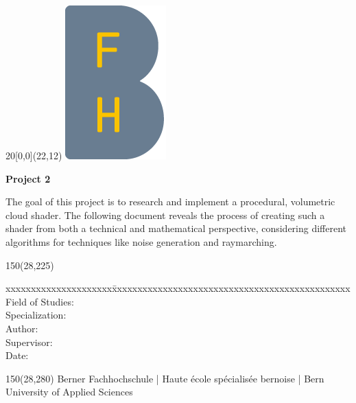 
\begin{titlepage}

\setlength{\unitlength}{1mm}

\begin{textblock}{20}[0,0](22,12)
    \includegraphics{../img/BFH_Logo_B.png}
\end{textblock}

\begin{flushleft}

\vspace*{21mm}

\fontsize{24.88pt}{40pt}\selectfont
\textbf{\doctitle}
\vspace{2mm}

\fontsize{17.28pt}{24pt}\selectfont\vspace{0.3em}
\docsubtitle
\vspace{5mm}

\fontsize{10pt}{12pt}\selectfont
\textbf{Project 2}

\fontsize{10pt}{12pt}\selectfont
The goal of this project is to research and implement a procedural, volumetric cloud shader. The following document reveals the process of creating such a shader from both a technical and mathematical perspective, considering different algorithms for techniques like noise generation and raymarching.
\begin{textblock}{150}(28,225)
\fontsize{10pt}{17pt}
\begin{tabbing}
xxxxxxxxxxxxxxxxxxxxx\=xxxxxxxxxxxxxxxxxxxxxxxxxxxxxxxxxxxxxxxxxxxxxxx \kill
Field of Studies:	\> \fieldofstudies	\\
Specialization:	    \> \specialisation	\\
Author:		        \> \docauthor \\
Supervisor:         \> \prof \\
Date:			    \> \versiondate
\end{tabbing}

\end{textblock}

\begin{textblock}{150}(28,280)
\noindent 
\color{bfhgrey}\fontsize{9pt}{10pt}\selectfont
Berner Fachhochschule | Haute \'ecole sp\'ecialis\'ee bernoise | Bern University of Applied Sciences
\color{black}\selectfont
\end{textblock}

\end{flushleft}

\end{titlepage}

\clearpage
